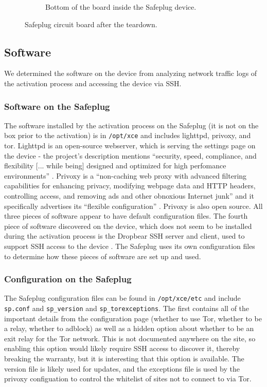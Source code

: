 \begin{figure}[htb]
\begin{subfigure}[b]{.3\textwidth}
\caption{Bottom of the board inside the Safeplug device.}
\label{fig:bottom}
\end{subfigure}
\caption{Safeplug circuit board after the teardown.}
\end{figure}


\subsection{Software}
\label{software}
We determined the software on the device from analyzing network traffic logs of the activation process and accessing the device via SSH.

\subsubsection{Software on the Safeplug}
The software installed by the activation process on the Safeplug (it is not on the box prior to the activation) is in \verb!/opt/xce! and includes lighttpd, privoxy, and tor.  Lighttpd is an open-source webserver, which is serving the settings page on the device - the project's description mentions ``security, speed, compliance, and flexibility [... while being] designed and optimized for high perfomance environments'' \cite{lighttpd}.  Privoxy is a ``non-caching web proxy with advanced filtering capabilities for enhancing privacy, modifying webpage data and HTTP headers, controlling access, and removing ads and other obnoxious Internet junk'' and it specifically advertises its ``flexible configuration'' \cite{privoxy}.  Privoxy is also open source.  All three pieces of software appear to have default configuration files.  The fourth piece of software discovered on the device, which does not seem to be installed during the activation process is the Dropbear SSH server and client, used to support SSH access to the device \cite{dropbear}.  The Safeplug uses its own configuration files to determine how these pieces of software are set up and used.
    
\subsubsection{Configuration on the Safeplug}
\label{spconfig}
The Safeplug configuration files can be found in \verb!/opt/xce/etc! and include \verb!sp.conf! and \verb!sp_version! and \verb!sp_torexceptions!.  The first contains all of the important details from the configuration page (whether to use Tor, whether to be a relay, whether to adblock) as well as a hidden option about whether to be an exit relay for the Tor network.  This is not documented anywhere on the site, so enabling this option would likely require SSH access to discover it, thereby breaking the warranty, but it is interesting that this option is available.  The version file is likely used for updates, and the exceptions file is used by the privoxy configuation to control the whitelist of sites not to connect to via Tor.

